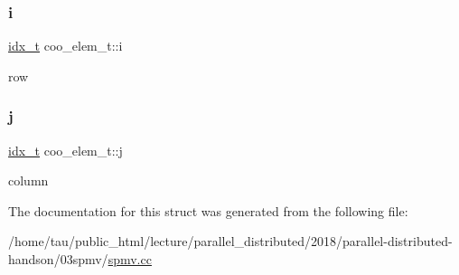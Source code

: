 \subsubsection{\texorpdfstring{i}{i}}
{\footnotesize\ttfamily \hyperlink{spmv_8cc_a8e93478a00e685bea5e6a3f617bf03a3}{idx\+\_\+t} coo\+\_\+elem\+\_\+t\+::i}

row \mbox{\label{structcoo__elem__t_a45a4cd1c7ffe70ddd75dff7c764bbfc6}} 
\subsubsection{\texorpdfstring{j}{j}}
{\footnotesize\ttfamily \hyperlink{spmv_8cc_a8e93478a00e685bea5e6a3f617bf03a3}{idx\+\_\+t} coo\+\_\+elem\+\_\+t\+::j}

column 

The documentation for this struct was generated from the following file\+:\begin{DoxyCompactItemize}
\item 
/home/tau/public\+\_\+html/lecture/parallel\+\_\+distributed/2018/parallel-\/distributed-\/handson/03spmv/\hyperlink{spmv_8cc}{spmv.\+cc}\end{DoxyCompactItemize}
